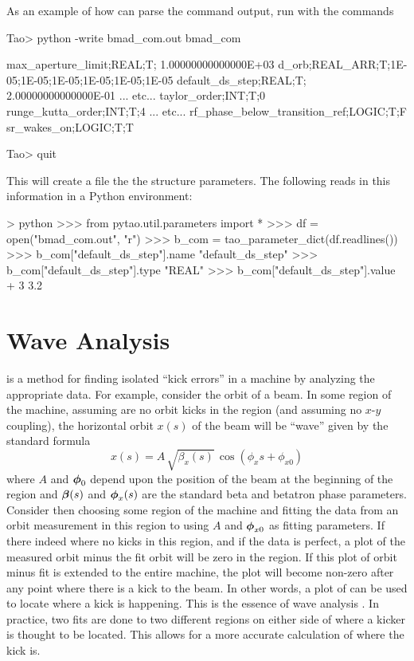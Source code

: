 \documentclass{hitec}     %
\newcommand{\Section}[1]{\section{#1}\vspace*{-1ex}}
\begin{document}
As an example of how  can parse the  command output, run \tao with the commands
\begin{code}
Tao> python -write bmad_com.out bmad_com

max_aperture_limit;REAL;T;  1.00000000000000E+03
d_orb;REAL_ARR;T;1E-05;1E-05;1E-05;1E-05;1E-05;1E-05
default_ds_step;REAL;T;  2.00000000000000E-01
... etc...
taylor_order;INT;T;0
runge_kutta_order;INT;T;4
... etc...
rf_phase_below_transition_ref;LOGIC;T;F
sr_wakes_on;LOGIC;T;T

Tao> quit
\end{code}
This will create a file  the the  structure parameters.
The following reads in this information in a Python environment:
\begin{code}
> python
>>> from pytao.util.parameters import *
>>> df = open("bmad_com.out", "r")
>>> b_com = tao_parameter_dict(df.readlines())
>>> b_com["default_ds_step"].name
"default_ds_step"
>>> b_com["default_ds_step"].type
"REAL"
>>> b_com["default_ds_step"].value + 3
3.2
\end{code}

\Section{Wave Analysis}
\label{s:wave.anal}

 is a method for finding isolated ``kick errors'' in a machine by analyzing the
appropriate data. For example, consider the orbit of a beam. In some region of the
machine, assuming are no orbit kicks in the region (and assuming no $x$-$y$ coupling), the
horizontal orbit $x(s)$ of the beam will be ``wave'' given by the standard formula
\begin{equation}
  x(s) = A \, \sqrt{\beta_x(s)} \, \cos(\phi_x{s} + \phi_{x0})
  \label{xabpp}
\end{equation}
where $A$ and $\boldsymbol{\phi}_0$ depend upon the position of the beam at the beginning of the region and
$\boldsymbol{\beta}(s)$ and $\boldsymbol{\phi}_x(s)$ are the standard beta and betatron phase parameters. Consider then
choosing some region of the machine and fitting the data from an orbit measurement in this region to
 using $A$ and $\boldsymbol{\phi}_{x0}$ as fitting parameters. If there indeed where no kicks in this
region, and if the data is perfect, a plot of the measured orbit minus the fit orbit will be zero in
the region. If this plot of orbit minus fit is extended to the entire machine, the plot will become
non-zero after any point where there is a kick to the beam. In other words, a plot of  can be used to locate where a kick is happening. This is the essence of wave analysis
\cite{b:phase.coupling.correction}. In practice, two fits are done to two different regions on
either side of where a kicker is thought to be located. This allows for a more accurate calculation
of where the kick is.
\end{document}

